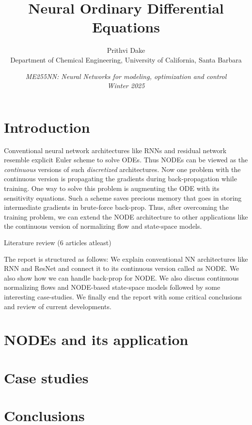 \documentclass[fontsize=11pt]{article}
\title{\bf{Neural Ordinary Differential Equations}}
\author{Prithvi Dake\\
Department of Chemical Engineering, University of California, Santa Barbara}
\date{\textit{ME255NN: Neural Networks for modeling, optimization and control} \\
\textit{Winter 2025}}
\theoremstyle{definition}
\begin{document}
\maketitle
\section{Introduction}

Conventional neural network architectures like RNNs and residual network
resemble explicit Euler scheme to solve ODEs. Thus NODEs can be viewed as 
the \textit{continuous} versions of such \textit{discretized} architectures.
Now one problem with the continuous version is propagating the gradients during
back-propagation while training. One way to solve this problem is augmenting
the ODE with its sensitivity equations. Such a scheme saves precious memory that
goes in storing intermediate gradients in brute-force back-prop. Thus, after
overcoming the training problem, we can extend the NODE architecture to other 
applications like the continuous version of normalizing flow and state-space models.

Literature review (6 articles atleast)

The report is structured as follows: We explain conventional NN architectures like
RNN and ResNet and connect it to its continuous version called as NODE. We also show
how we can handle back-prop for NODE. We also discuss continuous normalizing flows and
NODE-based state-space models followed by some interesting case-studies. We finally 
end the report with some critical conclusions and review of current developments.

\section{NODEs and its application}
\section{Case studies}
\section{Conclusions}


\newpage
\FloatBarrier


\end{document}
